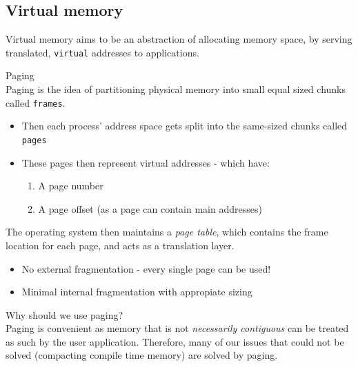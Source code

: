 \documentclass[journal, letterpaper]{IEEEtran}
\begin{document}
\subsection{Virtual memory}
Virtual memory aims to be an abstraction of allocating memory space, by serving translated, \verb|virtual| addresses to applications.
\begin{theory}{Paging} \\
    Paging is the idea of partitioning physical memory into small equal sized chunks called \verb|frames|.
    \begin{itemize}
        \item Then each process' address space gets split into the same-sized chunks called \verb|pages|
        \item These pages then represent virtual addresses - which have:
        \begin{enumerate}
            \item A page number
            \item A page offset (as a page can contain main addresses)
        \end{enumerate}
    \end{itemize}
    The operating system then maintains a \textit{page table}, which contains the frame location for each page, and acts as a translation layer.
    \begin{itemize}
        \item[\ding{51}] No external fragmentation - every single page can be used!
        \item[\ding{51}] Minimal internal fragmentation with appropiate sizing
    \end{itemize}
\end{theory}
\begin{aside}{Why should we use paging?} \\ 
    Paging is convenient as memory that is not \textit{necessarily contiguous} can be treated as such by the user application. Therefore, many of our issues that could not be solved (compacting compile time memory) are solved by paging.
\end{aside}
\end{document}
